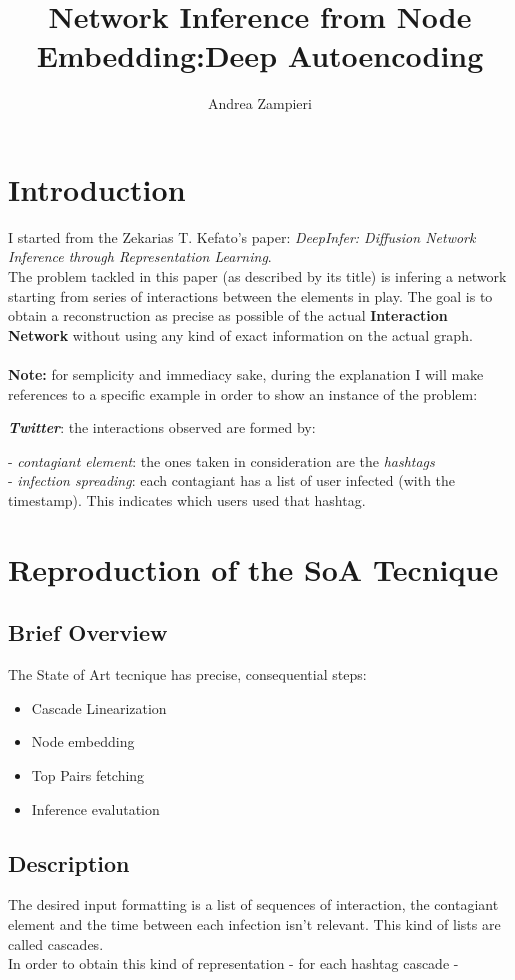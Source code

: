 \documentclass{article}
\author{Andrea Zampieri}
\title{Network Inference from Node Embedding:\newline Deep Autoencoding}
\begin{document}
	\maketitle
	\newpage
	\section{Introduction} 
		I started from the Zekarias	T. Kefato's paper: \textit{DeepInfer: Diffusion Network Inference through Representation Learning}.\\
		The problem tackled in this paper (as described by its title) is infering a network starting from series of interactions between the elements in play.
		The goal is to obtain a reconstruction as precise as possible of the actual \textbf{Interaction Network} without using any kind of exact information on the actual graph.\\ 
		\\
		\textbf{Note:} for semplicity and immediacy sake, during the explanation I will make references to a specific example in order to show an instance of the problem:\\
		
		\begin{addmargin}[2em]{0em}
			\textbf{\textit{Twitter}}: the interactions observed are formed by:\\
				\begin{addmargin}[2em]{0em}
					- \textit{contagiant element}: the ones taken in consideration are the \textit{hashtags} \\
					- \textit{infection spreading}: each contagiant has a list of user infected (with the timestamp). This indicates which users used that hashtag.
				\end{addmargin}
		\end{addmargin}
	
	\section{Reproduction of the SoA Tecnique}
		\subsection{Brief Overview}
			The State of Art tecnique has precise, consequential steps:
			\begin{itemize}
				\item Cascade Linearization
				\item Node embedding
				\item Top Pairs fetching
				\item Inference evalutation
			\end{itemize}
		\subsection{Description}
			The desired input formatting is a list of sequences of interaction, the contagiant element and the time between each infection isn't relevant. This kind of lists are called cascades.\\
			In order to obtain this kind of representation - for each hashtag cascade -
		
\end{document}
